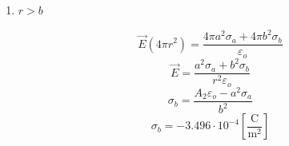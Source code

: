 \begin{enumerate}
\begin{enumerate}
      \item $r>b$

        $$\vec{E}(4\pi r^2)=\frac{4\pi a^2\sigma_a+4\pi b^2\sigma_b}{\varepsilon_o}$$
        $$\vec{E}=\frac{a^2\sigma_a+b^2\sigma_b}{r^2\varepsilon_o}$$
        $$\sigma_b=\frac{A_2\varepsilon_o-a^2\sigma_a}{b^2}$$
        $$\boxed{\sigma_b=-3.496\cdot10^{-4}\left[ \frac{\si{\coulomb}}{\si{\meter\squared}} \right]}$$

    \end{enumerate}
    
\end{enumerate}



